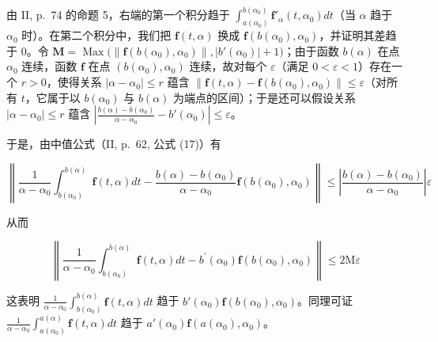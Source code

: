 由 II, p.~74 的命题 5，右端的第一个积分趋于 \(\int_{a(\alpha_0)}^{b(\alpha_0)} \mathbf{f}'_\alpha(t, \alpha_0) dt\)（当 \(\alpha\) 趋于 \(\alpha_0\) 时）。在第二个积分中，我们把 \(\mathbf{f}(t, \alpha)\) 换成 \(\mathbf{f}(b(\alpha_0), \alpha_0)\)，并证明其差趋于 0。令 \(\mathbf{M} = \operatorname{Max}\big( \| \mathbf{f}(b(\alpha_0), \alpha_0) \|, |b'(\alpha_0)| + 1 \big)\)；由于函数 \(b(\alpha)\) 在点 \(\alpha_0\) 连续，函数 \(\mathbf{f}\) 在点 \((b(\alpha_0), \alpha_0)\) 连续，故对每个 \(\varepsilon\)（满足 \(0 < \varepsilon < 1\)）存在一个 \(r > 0\)，使得关系 \(|\alpha - \alpha_0| \leqslant r\) 蕴含 \(\| \mathbf{f}(t, \alpha) - \mathbf{f}(b(\alpha_0), \alpha_0) \| \leqslant \varepsilon\)（对所有 \(t\)，它属于以 \(b(\alpha_0)\) 与 \(b(\alpha)\) 为端点的区间）；于是还可以假设关系 \(|\alpha - \alpha_0| \leqslant r\) 蕴含 \(\left| \frac{b(\alpha) - b(\alpha_0)}{\alpha - \alpha_0} - b'(\alpha_0) \right| \leqslant \varepsilon\)。

于是，由中值公式（II, p.~62, 公式 (17)）有

\[
\left\| \frac {1}{\alpha - \alpha_ {0}} \int_ {b (\alpha_ {0})} ^ {b (\alpha)} \mathbf {f} (t, \alpha) d t - \frac {b (\alpha) - b (\alpha_ {0})}{\alpha - \alpha_ {0}} \mathbf {f} (b (\alpha_ {0}), \alpha_ {0}) \right\| \leqslant \left| \frac {b (\alpha) - b (\alpha_ {0})}{\alpha - \alpha_ {0}} \right| \varepsilon
\]

从而

\[
\left\| \frac {1}{\alpha - \alpha_ {0}} \int_ {b (\alpha_ {0})} ^ {b (\alpha)} \mathbf {f} (t, \alpha) d t - b ^ {\prime} (\alpha_ {0}) \mathbf {f} (b (\alpha_ {0}), \alpha_ {0}) \right\| \leqslant 2 \mathrm{M} \varepsilon
\]

这表明 \(\frac{1}{\alpha - \alpha_0} \int_{b(\alpha_0)}^{b(\alpha)} \mathbf{f}(t, \alpha) dt\) 趋于 \(b'(\alpha_0)\mathbf{f}(b(\alpha_0), \alpha_0)\)。同理可证 \(\frac{1}{\alpha - \alpha_0} \int_{a(\alpha_0)}^{a(\alpha)} \mathbf{f}(t, \alpha) dt\) 趋于 \(a'(\alpha_0)\mathbf{f}(a(\alpha_0), \alpha_0)\)。

